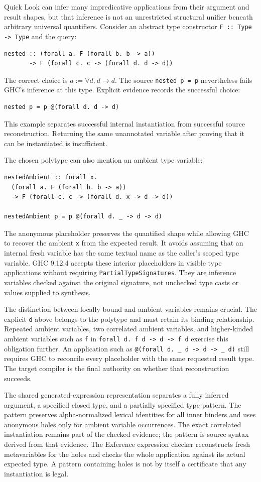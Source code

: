 \documentclass[11pt]{article}
\newcommand{\code}[1]{\texttt{#1}}
\begin{document}
Quick Look can infer many impredicative applications from their argument and
result shapes, but that inference is not an unrestricted structural unifier
beneath arbitrary universal quantifiers. Consider an abstract type constructor
\code{F :: Type -> Type} and the query:
\begin{lstlisting}
nested :: (forall a. F (forall b. b -> a))
       -> F (forall c. c -> (forall d. d -> d))
\end{lstlisting}
The correct choice is $a := \forall d.\ d\to d$. The source
\code{nested p = p} nevertheless fails GHC's inference at this type. Explicit
evidence records the successful choice:
\begin{lstlisting}
nested p = p @(forall d. d -> d)
\end{lstlisting}
This example separates successful internal instantiation from successful
source reconstruction. Returning the same unannotated variable after proving
that it can be instantiated is insufficient.

The chosen polytype can also mention an ambient type variable:
\begin{lstlisting}
nestedAmbient :: forall x.
  (forall a. F (forall b. b -> a))
  -> F (forall c. c -> (forall d. x -> d -> d))

nestedAmbient p = p @(forall d. _ -> d -> d)
\end{lstlisting}
The anonymous placeholder preserves the quantified shape while allowing GHC
to recover the ambient \code{x} from the expected result. It avoids assuming
that an internal fresh variable has the same textual name as the caller's
scoped type variable. GHC 9.12.4 accepts these interior placeholders in visible
type applications without requiring \code{PartialTypeSignatures}. They are
inference variables checked against the original signature, not unchecked
type casts or values supplied to synthesis.

The distinction between locally bound and ambient variables remains crucial.
The explicit \code{d} above belongs to the polytype and must retain its binding
relationship. Repeated ambient variables, two correlated ambient variables,
and higher-kinded ambient variables such as \code{f} in
\code{forall d. f d -> d -> f d} exercise this obligation further. An
application such as \code{@(forall d. \_ d -> d -> \_ d)} still requires GHC to
reconcile every placeholder with the same requested result type. The target
compiler is the final authority on whether that reconstruction succeeds.

The shared generated-expression representation separates a fully inferred
argument, a specified closed type, and a partially specified type pattern.
The pattern preserves alpha-normalized lexical identities for all inner
binders and uses anonymous holes only for ambient variable occurrences. The
exact correlated instantiation remains part of the checked evidence; the
pattern is source syntax derived from that evidence. The Exference expression
checker reconstructs fresh metavariables for the holes and checks the whole
application against its actual expected type. A pattern containing holes is
not by itself a certificate that any instantiation is legal.
\end{document}
